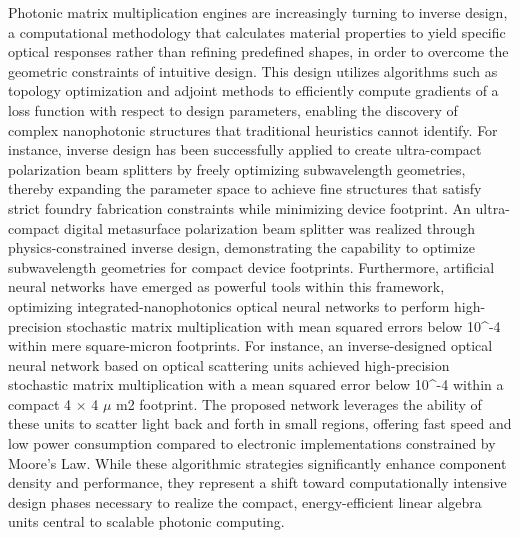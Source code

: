 \documentclass[11pt]{article}
\begin{document}
Photonic matrix multiplication engines are increasingly turning to inverse design, a computational methodology that calculates material properties to yield specific optical responses rather than refining predefined shapes, in order to overcome the geometric constraints of intuitive design. \citep{doi_10_1364_oe_530479_45946046} \citep{doi_10_1117_12_2649964_b6e13b8f} This design utilizes algorithms such as topology optimization and adjoint methods to efficiently compute gradients of a loss function with respect to design parameters, enabling the discovery of complex nanophotonic structures that traditional heuristics cannot identify. For instance, inverse design has been successfully applied to create ultra-compact polarization beam splitters by freely optimizing subwavelength geometries, thereby expanding the parameter space to achieve fine structures that satisfy strict foundry fabrication constraints while minimizing device footprint. An ultra-compact digital metasurface polarization beam splitter was realized through physics-constrained inverse design, demonstrating the capability to optimize subwavelength geometries for compact device footprints. \citep{doi_10_3390_app121910064_718c1a26} Furthermore, artificial neural networks have emerged as powerful tools within this framework, optimizing integrated-nanophotonics optical neural networks to perform high-precision stochastic matrix multiplication with mean squared errors below 10\^{}-4 within mere square-micron footprints. For instance, an inverse-designed optical neural network based on optical scattering units achieved high-precision stochastic matrix multiplication with a mean squared error below 10\^{}-4 within a compact 4 \(\times\) 4 \(\mu\) m2 footprint. The proposed network leverages the ability of these units to scatter light back and forth in small regions, offering fast speed and low power consumption compared to electronic implementations constrained by Moore's Law. \citep{doi_10_1016_j_scib_2020_03_042_6b632485} While these algorithmic strategies significantly enhance component density and performance, they represent a shift toward computationally intensive design phases necessary to realize the compact, energy-efficient linear algebra units central to scalable photonic computing. \citep{doi_10_1515_nanoph_2020_0379_1cc596ab} \citep{doi_10_3390_app121910064_718c1a26} \citep{doi_10_1016_j_scib_2020_03_042_6b632485}
\end{document}
